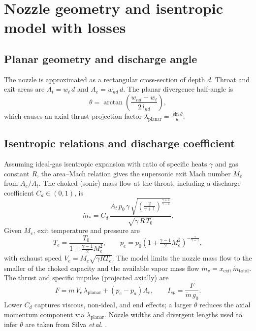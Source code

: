 \documentclass[11pt,a4paper]{article}
\begin{document}
\section{Nozzle geometry and isentropic model with losses}
\subsection{Planar geometry and discharge angle}
The nozzle is approximated as a rectangular cross-section of depth \(d\). Throat and exit areas are \(A_t=w_t\,d\) and \(A_e=w_{nd}\,d\). The planar divergence half-angle is
\begin{equation}
  \theta = \arctan\!\left(\frac{w_{nd}-w_t}{2\,l_{nd}}\right),
\end{equation}
which causes an axial thrust projection factor \(\lambda_{\text{planar}} = \frac{\sin \theta}{\theta}\).

\subsection{Isentropic relations and discharge coefficient}
Assuming ideal-gas isentropic expansion with ratio of specific heats \(\gamma\) and gas constant \(R\), the area--Mach relation gives the supersonic exit Mach number \(M_e\) from \(A_e/A_t\). The choked (sonic) mass flow at the throat, including a discharge coefficient \(C_d\in(0,1)\), is
\begin{equation}
  \dot m_* = C_d\,\frac{A_t\,p_0\,\gamma\,\sqrt{\left(\tfrac{2}{\gamma+1}\right)^{\tfrac{\gamma+1}{\gamma-1}}}}{\sqrt{\gamma\,R\,T_0}}.
\end{equation}
Given \(M_e\), exit temperature and pressure are
\begin{equation}
  T_e = \frac{T_0}{1+\tfrac{\gamma-1}{2}M_e^2},\qquad p_e = p_0\left(1+\tfrac{\gamma-1}{2}M_e^2\right)^{-\tfrac{\gamma}{\gamma-1}},
\end{equation}
with exhaust speed \(V_e=M_e\sqrt{\gamma R T_e}\). The model limits the nozzle mass flow to the smaller of the choked capacity and the available vapor mass flow \(\dot m_v=x_{\text{exit}}\,\dot m_{\text{total}}\). The thrust and specific impulse (projected axially) are
\begin{equation}
  F=\dot m\,V_e\,\lambda_{\text{planar}} + (p_e-p_a)A_e,\qquad I_{sp}=\frac{F}{\dot m\,g_0}.
\end{equation}
Lower \(C_d\) captures viscous, non-ideal, and end effects; a larger \(\theta\) reduces the axial momentum component via \(\lambda_{\text{planar}}\). Nozzle widths and divergent lengths used to infer \(\theta\) are taken from Silva \emph{et\,al.} \cite{Silva2023}.
\end{document}
